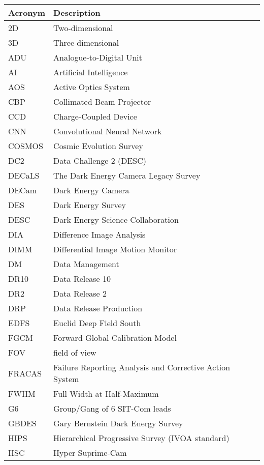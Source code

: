 \addtocounter{table}{-1}
\begin{longtable}{p{}p{}}\hline
\textbf{Acronym} & \textbf{Description}  \\\hline

2D & Two-dimensional \\\hline
3D & Three-dimensional \\\hline
ADU & Analogue-to-Digital Unit \\\hline
AI & Artificial Intelligence \\\hline
AOS & Active Optics System \\\hline
CBP & Collimated Beam Projector \\\hline
CCD & Charge-Coupled Device \\\hline
CNN & Convolutional Neural Network \\\hline
COSMOS & Cosmic Evolution Survey \\\hline
DC2 & Data Challenge 2 (DESC) \\\hline
DECaLS & The Dark Energy Camera Legacy Survey \\\hline
DECam & Dark Energy Camera \\\hline
DES & Dark Energy Survey \\\hline
DESC & Dark Energy Science Collaboration \\\hline
DIA & Difference Image Analysis \\\hline
DIMM & Differential Image Motion Monitor \\\hline
DM & Data Management \\\hline
DR10 & Data Release 10 \\\hline
DR2 & Data Release 2 \\\hline
DRP & Data Release Production \\\hline
EDFS & Euclid Deep Field South \\\hline
FGCM & Forward Global Calibration Model \\\hline
FOV & field of view \\\hline
FRACAS & Failure Reporting Analysis and Corrective Action System \\\hline
FWHM & Full Width at Half-Maximum \\\hline
G6 & Group/Gang of 6 SIT-Com leads \\\hline
GBDES & Gary Bernstein Dark Energy Survey \\\hline
HIPS & Hierarchical Progressive Survey (IVOA standard) \\\hline
HSC & Hyper Suprime-Cam \\\hline

\end{longtable}
